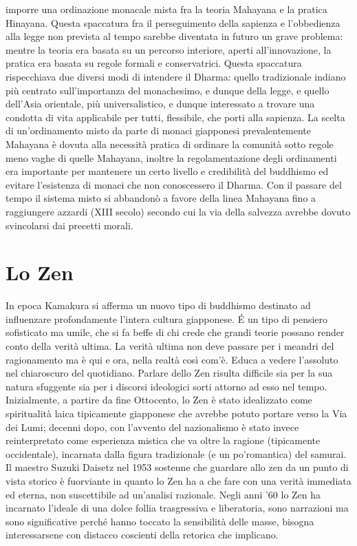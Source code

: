 \documentclass[10pt,a4paper]{report}
\begin{document}
imporre una ordinazione monacale mista fra la teoria Mahayana e la pratica Hinayana. Questa spaccatura fra il perseguimento della sapienza e l'obbedienza alla legge non prevista al tempo sarebbe diventata in futuro un grave problema: mentre la teoria era basata su un percorso interiore, aperti all'innovazione, la pratica era basata su regole formali e conservatrici. Questa spaccatura rispecchiava due diversi modi di intendere il Dharma: quello tradizionale indiano più centrato sull'importanza del monachesimo, e dunque della legge, e quello dell'Asia orientale, più universalistico, e dunque interessato a trovare una condotta di vita applicabile per tutti, flessibile, che porti alla sapienza. La scelta di un'ordinamento misto da parte di monaci giapponesi prevalentemente Mahayana è dovuta alla necessità pratica di ordinare la comunità sotto regole meno vaghe di quelle Mahayana, inoltre la regolamentazione degli ordinamenti era importante per mantenere un certo livello e credibilità del buddhismo ed evitare l'esistenza di monaci che non conoscessero il Dharma. Con il passare del tempo il sistema misto si abbandonò a favore della linea Mahayana fino a raggiungere azzardi (XIII secolo) secondo cui la via della salvezza avrebbe dovuto svincolarsi dai precetti morali. 
\section{Lo Zen}
In epoca Kamakura si afferma un nuovo tipo di buddhismo destinato ad influenzare profondamente l'intera cultura giapponese. \'E un tipo di pensiero sofisticato ma umile, che si fa beffe di chi crede che grandi teorie possano render conto della verità ultima. La verità ultima non deve passare per i meandri del ragionamento ma è qui e ora, nella realtà così com'è. Educa a vedere l'assoluto nel chiaroscuro del quotidiano. Parlare dello Zen risulta difficile sia per la sua natura sfuggente sia per i discorsi ideologici sorti attorno ad esso nel tempo. Inizialmente, a partire da fine Ottocento, lo Zen è stato idealizzato come spiritualità laica tipicamente giapponese che avrebbe potuto portare verso la Via dei Lumi; decenni dopo, con l'avvento del nazionalismo è stato invece reinterpretato come esperienza mistica che va oltre la ragione (tipicamente occidentale), incarnata dalla figura tradizionale (e un po'romantica) del samurai. Il maestro Suzuki Daisetz nel 1953 sostenne che guardare allo zen da un punto di vista storico è fuorviante in quanto lo Zen ha a che fare con una verità immediata ed eterna, non suscettibile ad un'analisi razionale. Negli anni '60 lo Zen ha incarnato l'ideale di una dolce follia trasgressiva e liberatoria, sono narrazioni ma sono significative perché hanno toccato la sensibilità delle masse, bisogna interessarsene con distacco coscienti della retorica che implicano.
\end{document}
